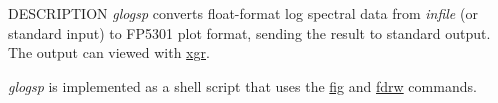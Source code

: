 \begin{synopsis}
\item[glogsp] [ --F $F$] [ --O $O$ ] [ --x $X$ ] [ --y $ymin \; ymax$ ] [ --ys $YS$ ] 
              [ --p $P$ ] [ --ln $LN$ ] 
\item[\ ~~~~~~~] [ --s $S$ ] [ --l $L$ ] [ --c $comment$ ] [ {\em infile} ]
\end{synopsis}

\begin{qsection}{DESCRIPTION}
{\em glogsp} converts float-format log spectral data 
from {\em infile} (or standard input)
to FP5301 plot format, 
sending the result to standard output. 
The output can viewed with \hyperlink{xgr}{xgr}.

{\em glogsp} is implemented as a shell script 
that uses the \hyperlink{fig}{fig} and \hyperlink{fdrw}{fdrw} commands.
\end{qsection}

